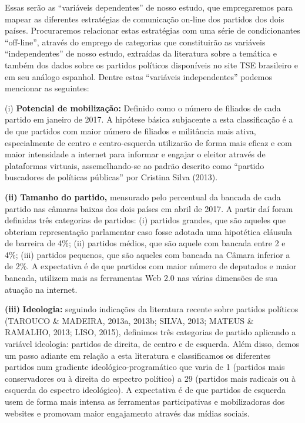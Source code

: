 Essas serão as ``variáveis dependentes'' de nosso estudo, que
empregaremos para mapear as diferentes estratégias de comunicação
on-line dos partidos dos dois países. Procuraremos relacionar estas
estratégias com uma série de condicionantes ``off-line'', através do
emprego de categorias que constituirão as variáveis ``independentes'' de
nosso estudo, extraídas da literatura sobre a temática e também dos
dados sobre os partidos políticos disponíveis no site TSE brasileiro e
em seu análogo espanhol. Dentre estas ``variáveis independentes''
podemos mencionar as seguintes:

(i) \textbf{Potencial de mobilização:} Definido como o número de
filiados de cada partido em janeiro de 2017. A hipótese básica
subjacente a esta classificação é a de que partidos com maior número de
filiados e militância mais ativa, especialmente de centro e
centro-esquerda utilizarão de forma mais eficaz e com maior intensidade
a internet para informar e engajar o eleitor através de plataformas
virtuais, assemelhando-se ao padrão descrito como ``partido buscadores
de políticas públicas'' por Cristina Silva (2013).

\textbf{(ii)} \textbf{Tamanho do partido,} mensurado pelo percentual da
bancada de cada partido nas câmaras baixas dos dois países em abril de
2017. A partir daí foram definidas três categorias de partidos: (i)
partidos grandes, que são aqueles que obteriam representação parlamentar
caso fosse adotada uma hipotética cláusula de barreira de 4\%; (ii)
partidos médios, que são aquele com bancada entre 2 e 4\%; (iii)
partidos pequenos, que são aqueles com bancada na Câmara inferior a de
2\%. A expectativa é de que partidos com maior número de deputados e
maior bancada, utilizem mais as ferramentas Web 2.0 nas várias dimensões
de sua atuação na internet.

\textbf{(iii)} \textbf{Ideologia:} seguindo indicações da literatura
recente sobre partidos políticos (TAROUCO \& MADEIRA, 2013a, 2013b;
SILVA, 2013; MATEUS \& RAMALHO, 2013; LISO, 2015), definimos três
categorias de partido aplicando a variável ideologia: partidos de
direita, de centro e de esquerda. Além disso, demos um passo adiante em
relação a esta literatura e classificamos os diferentes partidos num
gradiente ideológico-programático que varia de 1 (partidos mais
conservadores ou à direita do espectro político) a 29 (partidos mais
radicais ou à esquerda do espectro ideológico). A expectativa é de que
partidos de esquerda usem de forma mais intensa as ferramentas
participativas e mobilizadoras dos websites e promovam maior engajamento
através das mídias sociais.

